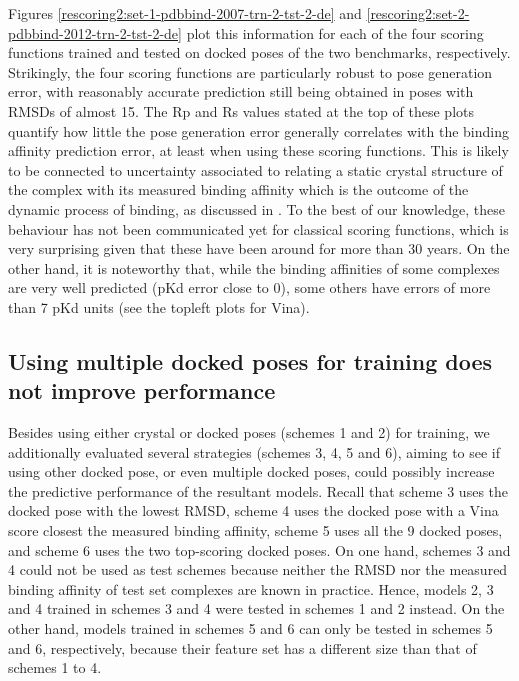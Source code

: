 \documentclass[twocolumn]{bmcart}
\begin{document}
Figures \ref{rescoring2:set-1-pdbbind-2007-trn-2-tst-2-de} and \ref{rescoring2:set-2-pdbbind-2012-trn-2-tst-2-de} plot this information for each of the four scoring functions trained and tested on docked poses of the two benchmarks, respectively. Strikingly, the four scoring functions are particularly robust to pose generation error, with reasonably accurate prediction still being obtained in poses with RMSDs of almost 15. The Rp and Rs values stated at the top of these plots quantify how little the pose generation error generally correlates with the binding affinity prediction error, at least when using these scoring functions. This is likely to be connected to uncertainty associated to relating a static crystal structure of the complex with its measured binding affinity which is the outcome of the dynamic process of binding, as discussed in \cite{1370}. To the best of our knowledge, these behaviour has not been communicated yet for classical scoring functions, which is very surprising given that these have been around for more than 30 years. On the other hand, it is noteworthy that, while the binding affinities of some complexes are very well predicted (pKd error close to 0), some others have errors of more than 7 pKd units (see the topleft plots for Vina).

\subsection*{Using multiple docked poses for training does not improve performance}

Besides using either crystal or docked poses (schemes 1 and 2) for training, we additionally evaluated several strategies (schemes 3, 4, 5 and 6), aiming to see if using other docked pose, or even multiple docked poses, could possibly increase the predictive performance of the resultant models. Recall that scheme 3 uses the docked pose with the lowest RMSD, scheme 4 uses the docked pose with a Vina score closest the measured binding affinity, scheme 5 uses all the 9 docked poses, and scheme 6 uses the two top-scoring docked poses. On one hand, schemes 3 and 4 could not be used as test schemes because neither the RMSD nor the measured binding affinity of test set complexes are known in practice. Hence, models 2, 3 and 4 trained in schemes 3 and 4 were tested in schemes 1 and 2 instead. On the other hand, models trained in schemes 5 and 6 can only be tested in schemes 5 and 6, respectively, because their feature set has a different size than that of schemes 1 to 4.
\end{document}
